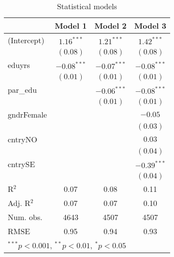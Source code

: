 
\begin{table}
\begin{center}
\begin{tabular}{l c c c }
\hline
 & Model 1 & Model 2 & Model 3 \\
\hline
(Intercept) & $1.16^{***}$  & $1.21^{***}$  & $1.42^{***}$  \\
            & $(0.08)$      & $(0.08)$      & $(0.08)$      \\
eduyrs      & $-0.08^{***}$ & $-0.07^{***}$ & $-0.08^{***}$ \\
            & $(0.01)$      & $(0.01)$      & $(0.01)$      \\
par\_edu    &               & $-0.06^{***}$ & $-0.08^{***}$ \\
            &               & $(0.01)$      & $(0.01)$      \\
gndrFemale  &               &               & $-0.05$       \\
            &               &               & $(0.03)$      \\
cntryNO     &               &               & $0.03$        \\
            &               &               & $(0.04)$      \\
cntrySE     &               &               & $-0.39^{***}$ \\
            &               &               & $(0.04)$      \\
\hline
R$^2$       & 0.07          & 0.08          & 0.11          \\
Adj. R$^2$  & 0.07          & 0.07          & 0.10          \\
Num. obs.   & 4643          & 4507          & 4507          \\
RMSE        & 0.95          & 0.94          & 0.93          \\
\hline
\multicolumn{4}{l}{\scriptsize{$^{***}p<0.001$, $^{**}p<0.01$, $^*p<0.05$}}
\end{tabular}
\caption{Statistical models}
\label{table:coefficients}
\end{center}
\end{table}
